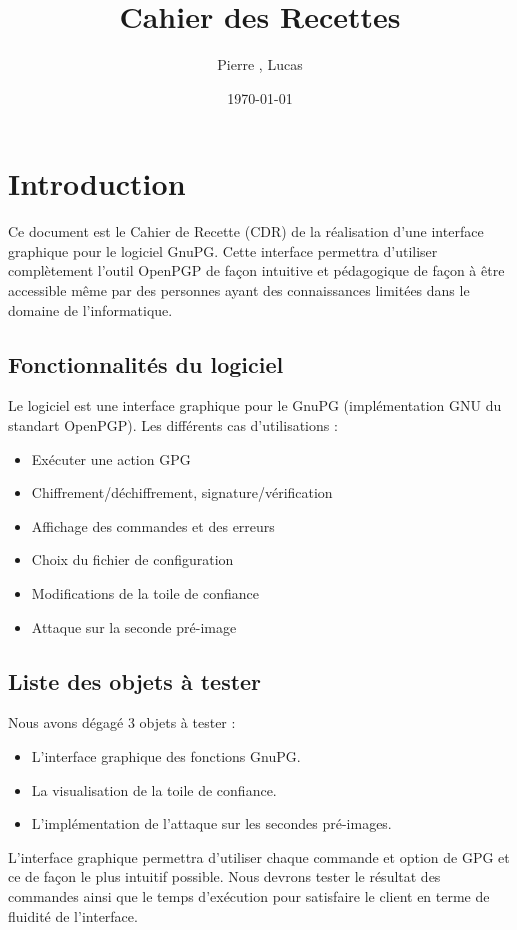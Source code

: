 \documentclass{../res/univ-projet}
\title{Cahier des Recettes}
\author{Pierre \bsc{Balmelle}, Lucas \bsc{Barbay}}
\date{\today}
\begin{document}
\maketitle
\newpage
\tableofcontents
\newpage

\section{Introduction}

Ce document est le Cahier de Recette (CDR) de la réalisation d'une interface graphique pour le logiciel GnuPG.
Cette interface permettra d'utiliser complètement l'outil OpenPGP de façon intuitive et pédagogique de façon 
à être accessible même par des personnes ayant des connaissances limitées dans le domaine de l'informatique. 

\subsection{Fonctionnalités du logiciel}
Le logiciel est une interface graphique pour le GnuPG (implémentation GNU du standart OpenPGP).
Les différents cas d'utilisations :
\begin{itemize}
 \item Exécuter une action GPG
 \item Chiffrement/déchiffrement, signature/vérification
 \item Affichage des commandes et des erreurs
 \item Choix du fichier de configuration
 \item Modifications de la toile de confiance
 \item Attaque sur la seconde pré-image
\end{itemize}

\subsection{Liste des objets à tester}
Nous avons dégagé 3 objets à tester : 
\begin{itemize}
 \item L'interface graphique des fonctions GnuPG.
 \item La visualisation de la toile de confiance.
 \item L'implémentation de l'attaque sur les secondes pré-images. 
\end{itemize}

L'interface graphique permettra d'utiliser chaque commande et option de GPG et ce de façon le plus intuitif possible. Nous
devrons tester le résultat des commandes ainsi que le temps d'exécution pour satisfaire le client en terme de fluidité de l'interface.
\end{document}
